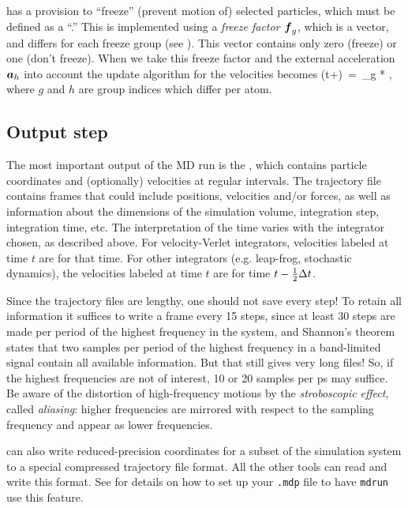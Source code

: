 {\gromacs} has a provision to ``freeze''  (prevent motion of) selected
particles, which must be defined as a ``.'' This is implemented
using a {\em freeze factor $\mbox{\boldmath ${f}$}_g$}, which is a vector, and differs for each
freeze group (see ). This vector contains only
zero (freeze) or one (don't freeze).
When we take this freeze factor and the external acceleration $\mbox{\boldmath ${a}$}_h$ into 
account the update algorithm for the velocities becomes
\beq
{}(t+\hdt)~=~_g * \lambda * ,
\eeq
where $g$ and $h$ are group indices which differ per atom.

\subsection{Output step}
The most important output of the MD run is the {\em
{}}, which contains particle coordinates
and (optionally) velocities at regular intervals.
The trajectory file contains frames that could include positions,
velocities and/or forces, as well as information about the dimensions
of the simulation volume, integration step, integration time, etc. The
interpretation of the time varies with the integrator chosen, as
described above. For velocity-Verlet integrators, velocities labeled
at time $t$ are for that time. For other integrators (e.g. leap-frog,
stochastic dynamics), the velocities labeled at time $t$ are for time
$t - \frac{1}{2} {\Delta t}$.

Since the trajectory
files are lengthy, one should not save every step! To retain all
information it suffices to write a frame every 15 steps, since at
least 30 steps are made per period of the highest frequency in the
system, and Shannon's  theorem states that two samples per
period of the highest frequency in a band-limited signal contain all
available information. But that still gives very long files! So, if
the highest frequencies are not of interest, 10 or 20 samples per ps
may suffice. Be aware of the distortion of high-frequency motions by
the {\em stroboscopic effect}, called {\em aliasing}: higher frequencies
are  mirrored with respect to the sampling frequency and appear as
lower frequencies.

{\gromacs} can also write reduced-precision coordinates for a subset of
the simulation system to a special compressed trajectory file
format. All the other tools can read and write this format. See
 for details on how to set up your {\tt .mdp} file
to have {\tt mdrun} use this feature.

